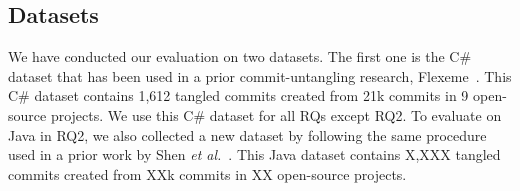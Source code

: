 \subsection{Datasets}

We have conducted our evaluation on two datasets. The first one is the
C\# dataset that has been used in a prior commit-untangling research,
Flexeme~\cite{flexeme-fse20}. This C\# dataset contains 1,612 tangled
commits created from 21k commits in 9 open-source projects. We use
this C\# dataset for all RQs except RQ2. To evaluate {\tool} on Java
in RQ2, we also collected a new dataset by following the same
procedure used in a prior work by Shen {\em et
  al.}~\cite{smartcommit-fse21}. This Java dataset contains X,XXX
tangled commits created from XXk commits in XX open-source projects.

